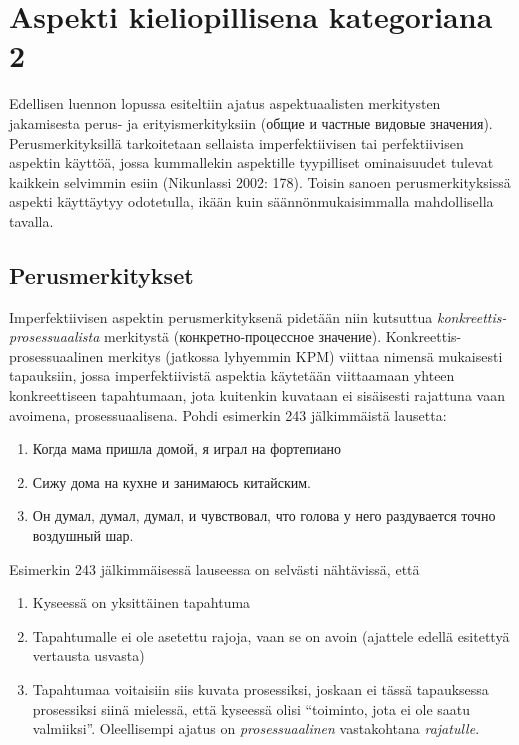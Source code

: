 \documentclass[]{scrreprt}
\providecommand{\tightlist}{%
  \setlength{\itemsep}{0pt}\setlength{\parskip}{0pt}}
\begin{document}
\chapter{Aspekti kieliopillisena kategoriana
2}\label{luento-16-aspekti-kieliopillisena-kategoriana-2}


Edellisen luennon lopussa esiteltiin ajatus aspektuaalisten merkitysten
jakamisesta perus- ja erityismerkityksiin (общие и частные видовые
значения). Perusmerkityksillä tarkoitetaan sellaista imperfektiivisen
tai perfektiivisen aspektin käyttöä, jossa kummallekin aspektille
tyypilliset ominaisuudet tulevat kaikkein selvimmin esiin (Nikunlassi
2002: 178). Toisin sanoen perusmerkityksissä aspekti käyttäytyy
odotetulla, ikään kuin säännönmukaisimmalla mahdollisella tavalla.

\section{Perusmerkitykset}\label{perusmerkitykset}

Imperfektiivisen aspektin perusmerkityksenä pidetään niin kutsuttua
\emph{konkreettis-prosessuaalista} merkitystä (конкретно-процессное
значение). Konkreettis-prosessuaalinen merkitys (jatkossa lyhyemmin KPM)
viittaa nimensä mukaisesti tapauksiin, jossa imperfektiivistä aspektia
käytetään viittaamaan yhteen konkreettiseen tapahtumaan, jota kuitenkin
kuvataan ei sisäisesti rajattuna vaan avoimena, prosessuaalisena. Pohdi
esimerkin 243 jälkimmäistä lausetta:

\begin{enumerate}
\def\labelenumi{(\arabic{enumi})}
\setcounter{enumi}{242}
\tightlist
\item
  Когда мама пришла домой, я играл на фортепиано
\item
  Сижу дома на кухне и занимаюсь китайским.
\item
  Он думал, думал, думал, и чувствовал, что голова у него раздувается
  точно воздушный шар.
\end{enumerate}

Esimerkin 243 jälkimmäisessä lauseessa on selvästi nähtävissä, että

\begin{enumerate}
\def\labelenumi{\arabic{enumi}.}
\tightlist
\item
  Kyseessä on yksittäinen tapahtuma
\item
  Tapahtumalle ei ole asetettu rajoja, vaan se on avoin (ajattele edellä
  esitettyä vertausta usvasta)
\item
  Tapahtumaa voitaisiin siis kuvata prosessiksi, joskaan ei tässä
  tapauksessa prosessiksi siinä mielessä, että kyseessä olisi
  ``toiminto, jota ei ole saatu valmiiksi''. Oleellisempi ajatus on
  \emph{prosessuaalinen} vastakohtana \emph{rajatulle}.
\end{enumerate}
\end{document}
